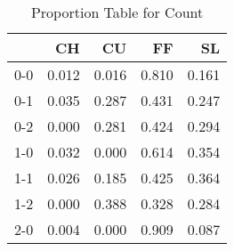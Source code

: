 \begin{table}[ht]
\centering
\begin{tabular}{rrrrr}
  \hline
 & CH & CU & FF & SL \\ 
  \hline
0-0 & 0.012 & 0.016 & 0.810 & 0.161 \\ 
  0-1 & 0.035 & 0.287 & 0.431 & 0.247 \\ 
  0-2 & 0.000 & 0.281 & 0.424 & 0.294 \\ 
  1-0 & 0.032 & 0.000 & 0.614 & 0.354 \\ 
  1-1 & 0.026 & 0.185 & 0.425 & 0.364 \\ 
  1-2 & 0.000 & 0.388 & 0.328 & 0.284 \\ 
  2-0 & 0.004 & 0.000 & 0.909 & 0.087 \\ 
   \hline
\end{tabular}
\caption{Proportion Table for Count} 
\end{table}
